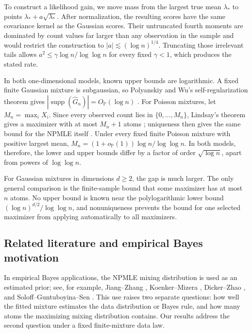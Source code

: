 \documentclass[11pt]{article}
\theoremstyle{definition}
\numberwithin{equation}{section}
\newcommand{\wh}{\widehat}
\DeclareMathOperator{\supp}{supp}
\begin{document}
To construct a likelihood gain, we move mass from the largest true mean
\(\lambda_*\) to points
\(\lambda_*+a\sqrt{\lambda_*}\). After normalization, the resulting scores
have the same covariance kernel as the Gaussian scores. Their untruncated
fourth moments are dominated by count values far larger than any observation
in the sample and would restrict the construction to
\(|a|\lesssim(\log n)^{1/4}\). Truncating those irrelevant tails allows
\(a^2\le\gamma\log n/\log\log n\) for every fixed \(\gamma<1\), which
produces the stated rate.

In both one-dimensional models, known upper bounds are logarithmic. A fixed
finite Gaussian mixture is subgaussian, so Polyanskiy and Wu's
self-regularization theorem gives
\(|\supp(\wh G_n)|=O_{\mathbb P}(\log n)\)
\cite{polyanskiy2020self}. For Poisson mixtures, let
\(M_n=\max_iX_i\). Since every observed count lies in
\(\{0,\dots,M_n\}\), Lindsay's theorem gives a maximizer with at most
\(M_n+1\) atoms \cite{lindsay1983geometryA}; uniqueness then gives the same
bound for the NPMLE itself \cite{lindsay1993uniqueness}. Under every fixed
finite Poisson mixture with positive largest mean,
\(M_n=(1+o_{\mathbb P}(1))\log n/\log\log n\). In both models, therefore,
the lower and upper bounds differ by a factor of order \(\sqrt{\log n}\),
apart from powers of \(\log\log n\).

For Gaussian mixtures in dimensions \(d\ge2\), the gap is much larger. The
only general comparison is the finite-sample bound that some maximizer has at
most \(n\) atoms. No upper bound is known near the polylogarithmic lower bound
\((\log n)^{d/2}/\log\log n\), and nonuniqueness prevents the bound for one
selected maximizer from applying automatically to all maximizers.

\subsection*{Related literature and empirical Bayes motivation}

In empirical Bayes applications, the NPMLE mixing distribution is used as an
estimated prior; see, for example, Jiang--Zhang \cite{jiang2009general},
Koenker--Mizera \cite{koenker2014convex}, Dicker--Zhao
\cite{dicker2016high}, and Soloff--Guntuboyina--Sen
\cite{soloff2024multivariate}. This use raises two separate questions: how
well the fitted mixture estimates the data distribution or Bayes rule, and how
many atoms the maximizing mixing distribution contains. Our results address
the second question under a fixed finite-mixture data law.
\end{document}
